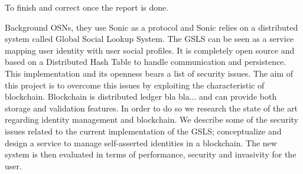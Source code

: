 
\begin{notation}
    To finish and correct once the report is done. 
\end{notation}
Background OSNs, they use Sonic as a protocol and Sonic relies on a distributed system called Global Social Lookup System. The GSLS can be seen as a service mapping user identity with user social profiles. It is completely open source and based on a Distributed Hash Table to handle communication and persistence. This implementation and its openness bears a list of security issues. The aim of this project is to overcome this issues by exploiting the characteristic of blockchain. Blockchain is distributed ledger bla bla... and can provide both storage and validation features. In order to do so we research the state of the art regarding identity management and blockchain. We describe some of the security issues related to the current implementation of the GSLS; conceptualize and design a service to manage self-asserted identities in a blockchain. The new system is then evaluated in terms of performance, security and invasivity for the user. 




